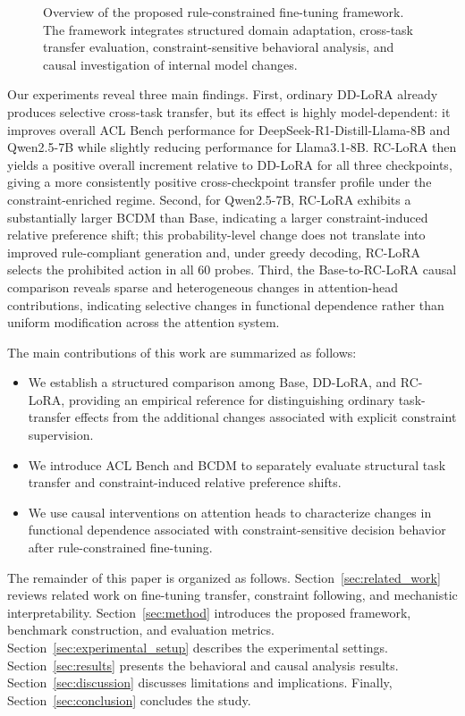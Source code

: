 \begin{figure}[ht]
\centering

\caption{
Overview of the proposed rule-constrained fine-tuning framework.
The framework integrates structured domain adaptation, cross-task transfer evaluation, constraint-sensitive behavioral analysis, and causal investigation of internal model changes.
}
\label{fig:framework}
\end{figure}


Our experiments reveal three main findings. First, ordinary DD-LoRA already produces selective cross-task transfer, but its effect is highly model-dependent: it improves overall ACL Bench performance for DeepSeek-R1-Distill-Llama-8B and Qwen2.5-7B while slightly reducing performance for Llama3.1-8B. RC-LoRA then yields a positive overall increment relative to DD-LoRA for all three checkpoints, giving a more consistently positive cross-checkpoint transfer profile under the constraint-enriched regime. Second, for Qwen2.5-7B, RC-LoRA exhibits a substantially larger BCDM than Base, indicating a larger constraint-induced relative preference shift; this probability-level change does not translate into improved rule-compliant generation and, under greedy decoding, RC-LoRA selects the prohibited action in all 60 probes. Third, the Base-to-RC-LoRA causal comparison reveals sparse and heterogeneous changes in attention-head contributions, indicating selective changes in functional dependence rather than uniform modification across the attention system.

The main contributions of this work are summarized as follows:

\begin{itemize}

    \item We establish a structured comparison among Base, DD-LoRA, and RC-LoRA, providing an empirical reference for distinguishing ordinary task-transfer effects from the additional changes associated with explicit constraint supervision.

    \item We introduce ACL Bench and BCDM to separately evaluate structural task transfer and constraint-induced relative preference shifts.

    \item We use causal interventions on attention heads to characterize changes in functional dependence associated with constraint-sensitive decision behavior after rule-constrained fine-tuning.

\end{itemize}


The remainder of this paper is organized as follows. Section~\ref{sec:related_work} reviews related work on fine-tuning transfer, constraint following, and mechanistic interpretability. Section~\ref{sec:method} introduces the proposed framework, benchmark construction, and evaluation metrics. Section~\ref{sec:experimental_setup} describes the experimental settings. Section~\ref{sec:results} presents the behavioral and causal analysis results. Section~\ref{sec:discussion} discusses limitations and implications. Finally, Section~\ref{sec:conclusion} concludes the study.
